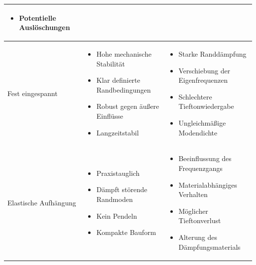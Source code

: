 \begin{table}[htbp]
\begin{tabularx}{\textwidth}{|X|X|X|}
\begin{itemize}[leftmargin=*, nosep, topsep=0pt, parsep=0pt]
    \item Potentielle Auslöschungen
\end{itemize}
\vspace{-2mm} \\
\hline
Fest eingespannt &
\vspace{-2mm}
\begin{itemize}[leftmargin=*, nosep, topsep=0pt, parsep=0pt]
    \item Hohe mechanische Stabilität
    \item Klar definierte Randbedingungen
    \item Robust gegen äußere Einflüsse
    \item Langzeitstabil
\end{itemize}
\vspace{-2mm}
&
\vspace{-2mm}
\begin{itemize}[leftmargin=*, nosep, topsep=0pt, parsep=0pt]
    \item Starke Randdämpfung
    \item Verschiebung der Eigenfrequenzen
    \item Schlechtere Tieftonwiedergabe
    \item Ungleichmäßige Modendichte
\end{itemize}
\vspace{-2mm} \\
\hline
Elastische Aufhängung &
\vspace{-2mm}
\begin{itemize}[leftmargin=*, nosep, topsep=0pt, parsep=0pt]
    \item Praxistauglich
    \item Dämpft störende Randmoden
    \item Kein Pendeln
    \item Kompakte Bauform
\end{itemize}
\vspace{-2mm}
&
\vspace{-2mm}
\begin{itemize}[leftmargin=*, nosep, topsep=0pt, parsep=0pt]
    \item Beeinflussung des Frequenzgangs
    \item Materialabhängiges Verhalten
    \item Möglicher Tieftonverlust
    \item Alterung des Dämpfungsmaterials
\end{itemize}
\vspace{-2mm} \\

\end{tabularx}
\end{table}
